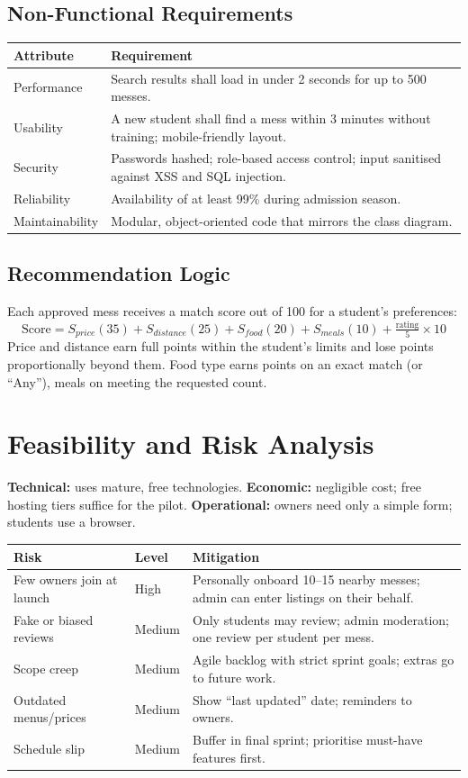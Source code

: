 \documentclass[11pt,a4paper]{article}
\begin{document}
\subsection{Non-Functional Requirements}
\begin{tabular}{@{}p{3cm}p{12cm}@{}}\toprule
\textbf{Attribute} & \textbf{Requirement}\\\midrule
Performance & Search results shall load in under 2 seconds for up to 500 messes.\\
Usability & A new student shall find a mess within 3 minutes without training; mobile-friendly layout.\\
Security & Passwords hashed; role-based access control; input sanitised against XSS and SQL injection.\\
Reliability & Availability of at least 99\% during admission season.\\
Maintainability & Modular, object-oriented code that mirrors the class diagram.\\\bottomrule
\end{tabular}

\subsection{Recommendation Logic}
Each approved mess receives a match score out of 100 for a student's preferences:
\[ \text{Score} = S_{price}(35) + S_{distance}(25) + S_{food}(20) + S_{meals}(10) + \tfrac{\text{rating}}{5}\times 10 \]
Price and distance earn full points within the student's limits and lose points proportionally beyond them. Food type earns points on an exact match (or ``Any''), meals on meeting the requested count.

\section{Feasibility and Risk Analysis}
\textbf{Technical:} uses mature, free technologies. \textbf{Economic:} negligible cost; free hosting tiers suffice for the pilot. \textbf{Operational:} owners need only a simple form; students use a browser.
\begin{longtable}{@{}p{4.2cm}p{1.8cm}p{9cm}@{}}\toprule
\textbf{Risk} & \textbf{Level} & \textbf{Mitigation}\\\midrule\endhead
Few owners join at launch & High & Personally onboard 10--15 nearby messes; admin can enter listings on their behalf.\\
Fake or biased reviews & Medium & Only students may review; admin moderation; one review per student per mess.\\
Scope creep & Medium & Agile backlog with strict sprint goals; extras go to future work.\\
Outdated menus/prices & Medium & Show ``last updated'' date; reminders to owners.\\
Schedule slip & Medium & Buffer in final sprint; prioritise must-have features first.\\\bottomrule
\end{longtable}
\end{document}
